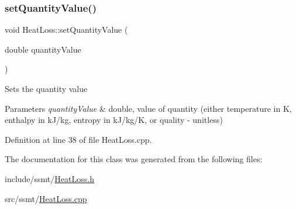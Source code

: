 \subsubsection{\texorpdfstring{set\+Quantity\+Value()}{setQuantityValue()}}
{\footnotesize\ttfamily void Heat\+Loss\+::set\+Quantity\+Value (\begin{DoxyParamCaption}\item[{double}]{quantity\+Value }\end{DoxyParamCaption})}

Sets the quantity value 
\begin{DoxyParams}{Parameters}
{\em quantity\+Value} & double, value of quantity (either temperature in K, enthalpy in k\+J/kg, entropy in k\+J/kg/K, or quality -\/ unitless) \\
\hline
\end{DoxyParams}


Definition at line 38 of file Heat\+Loss.\+cpp.



The documentation for this class was generated from the following files\+:\begin{DoxyCompactItemize}
\item 
include/ssmt/\hyperlink{_heat_loss_8h}{Heat\+Loss.\+h}\item 
src/ssmt/\hyperlink{_heat_loss_8cpp}{Heat\+Loss.\+cpp}\end{DoxyCompactItemize}
